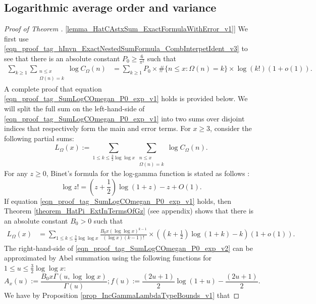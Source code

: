 \documentclass[11pt,reqno,a4letter]{article}
\newcommand{\hlocalref}[1]{\hyperref[#1]{\ref{#1}}}
\numberwithin{equation}{section}
\numberwithin{figure}{section}
\numberwithin{table}{section}
\theoremstyle{plain}
\numberwithin{theorem}{section}
\theoremstyle{definition}
\begin{document}
\subsection{Logarithmic average order and variance}
\label{subSection_AvgOrdersOfTheUnsignedSequences} 

\begin{proof}[Proof of Theorem \hlocalref{lemma_HatCAstxSum_ExactFormulaWithError_v1}]  
We first use \eqref{eqn_proof_tag_hInvn_ExactNestedSumFormula_CombInterpetIdent_v3} to 
see that there is an absolute constant $P_0 \geq \frac{6}{\pi^2}$ such that 
\begin{align}
\label{eqn_proof_tag_SumLogCOmegan_P0_exp_v1}
\sum_{k \geq 1} \sum_{\substack{n \leq x \\ \Omega(n)=k}} \log C_{\Omega}(n) & = 
	\sum_{k \geq 1} P_0 \times \#\{n \leq x: \Omega(n)=k\} \times \log(k!) (1 + o(1)). 
\end{align}
A complete proof that equation 
\eqref{eqn_proof_tag_SumLogCOmegan_P0_exp_v1} holds is provided below.
We will split the full sum on the left-hand-side of 
\eqref{eqn_proof_tag_SumLogCOmegan_P0_exp_v1} into two sums over disjoint indices 
that respectively form the main and error terms.
For $x \geq 3$, consider the following partial sums:
\[
L_{\Omega}(x) := \sum_{1 \leq k \leq \frac{3}{2}\log\log x} 
	\sum_{\substack{n \leq x \\ \Omega(n)=k}} \log C_{\Omega}(n). 
\]
For any $z \geq 0$, 
Binet's formula for the log-gamma function is stated as follows 
\cite[\S 5.9(i)]{NISTHB}: 
\[
\log z! = \left(z+\frac{1}{2}\right)\log(1+z) - z + O(1). 
\]
If equation \eqref{eqn_proof_tag_SumLogCOmegan_P0_exp_v1} holds, then 
Theorem \ref{theorem_HatPi_ExtInTermsOfGz} 
(see appendix) shows that there is an absolute constant $B_0 > 0$ such that 
\begin{align}
\label{eqn_proof_tag_SumLogCOmegan_P0_exp_v2}
L_{\Omega}(x) & = \sum_{1 \leq k \leq \frac{3}{2}\log\log x} 
	\frac{B_0 x (\log\log x)^{k-1}}{(\log x) (k-1)!} \times \left(
	\left(k+\frac{1}{2}\right) \log(1+k) - k\right)\left(1 + o(1)\right). 
\end{align}
The right-hand-side of \eqref{eqn_proof_tag_SumLogCOmegan_P0_exp_v2} can be 
approximated by Abel summation using the following functions for 
$1 \leq u \leq \frac{3}{2} \log\log x$: 
\[
A_x(u) := \frac{B_0 x \Gamma\left(u, \log\log x\right)}{\Gamma\left(u\right)}; 
     f(u) := \frac{(2u+1)}{2} \log\left(1 + u\right) - \frac{(2u+1)}{2}. 
\]
We have by Proposition \hlocalref{prop_IncGammaLambdaTypeBounds_v1} that 

\end{proof}
\end{document}
